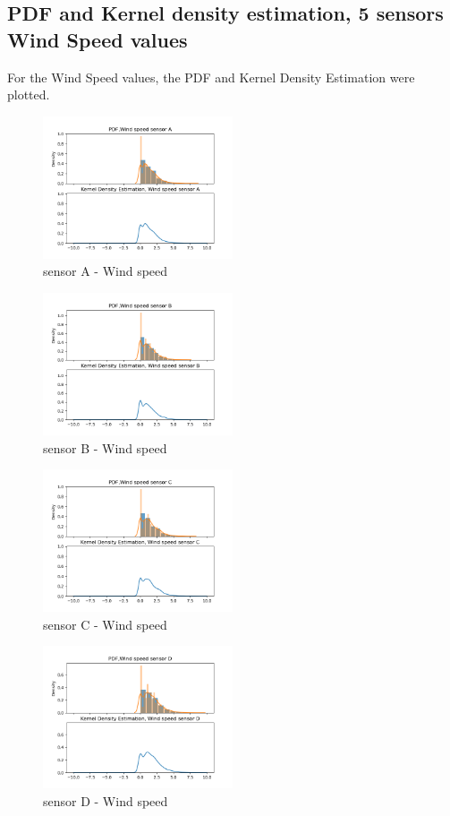 \documentclass[a4paper,12pt]{article} %
\begin{document}
\subsection{PDF and Kernel density estimation, 5 sensors Wind Speed values}
\vspace{10mm}
For the Wind Speed values, the PDF and Kernel Density Estimation were plotted.
\vspace{15mm}
\begin{figure}[H]   
	\centering 
	\includegraphics[width=0.5\textwidth]{Figure_10.png}
	\caption{sensor A - Wind speed} 
\end{figure}
\begin{figure}[H]   
	\centering 
	\includegraphics[width=0.5\textwidth]{Figure_11.png}
	\caption{sensor B - Wind speed} 
\end{figure}
\begin{figure}[H]   
	\centering 
	\includegraphics[width=0.5\textwidth]{Figure_12.png}
	\caption{sensor C - Wind speed} 
\end{figure}
\begin{figure}[H]   
	\centering 
	\includegraphics[width=0.5\textwidth]{Figure_13.png}
	\caption{sensor D - Wind speed} 
\end{figure}
\end{document}

